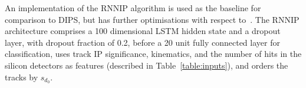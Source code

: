 An implementation of the RNNIP algorithm is used as the baseline for comparison to DIPS, but has further optimisations with respect to~\cite{ATL-PHYS-PUB-2017-003}. The RNNIP architecture comprises a 100 dimensional LSTM hidden state and a dropout layer, with dropout fraction of 0.2, before a 20 unit fully connected layer for classification, uses track IP significance, kinematics, and the number of hits in the silicon detectors as features (described in Table~\ref{table:inputs}), and orders the tracks by $s_{d_0}$.

